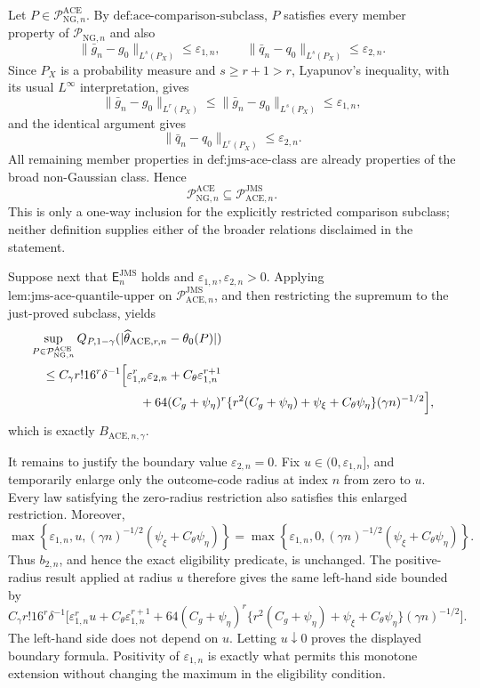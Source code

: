 Let \(P\in\mathcal P_{\mathrm{NG},n}^{\mathrm{ACE}}\).  By
\(\text{def:ace-comparison-subclass}\), \(P\) satisfies every member property of
\(\mathcal P_{\mathrm{NG},n}\) and also
\[
 \|\bar g_n-g_0\|_{L^s(P_X)}\le\varepsilon_{1,n},
 \qquad
 \|\bar q_n-q_0\|_{L^s(P_X)}\le\varepsilon_{2,n}.
\]
Since \(P_X\) is a probability measure and \(s\ge r+1>r\), Lyapunov's inequality, with its usual \(L^{\infty}\) interpretation, gives
\[
 \|\bar g_n-g_0\|_{L^r(P_X)}
 \le\|\bar g_n-g_0\|_{L^s(P_X)}
 \le\varepsilon_{1,n},
\]
and the identical argument gives
\[
 \|\bar q_n-q_0\|_{L^r(P_X)}
 \le\varepsilon_{2,n}.
\]
All remaining member properties in \(\text{def:jms-ace-class}\) are already properties of the broad non-Gaussian class.  Hence
\[
 \mathcal P_{\mathrm{NG},n}^{\mathrm{ACE}}
 \subseteq\mathcal P_{\mathrm{ACE},n}^{\mathrm{JMS}}.
\]
This is only a one-way inclusion for the explicitly restricted comparison subclass; neither definition supplies either of the broader relations disclaimed in the statement.

Suppose next that \(\mathsf E_n^{\mathrm{JMS}}\) holds and
\(\varepsilon_{1,n},\varepsilon_{2,n}>0\).  Applying
\(\text{lem:jms-ace-quantile-upper}\) on
\(\mathcal P_{\mathrm{ACE},n}^{\mathrm{JMS}}\), and then restricting the supremum to the just-proved subclass, yields
\[
\begin{aligned}
 &\sup_{P\in\mathcal P_{\mathrm{NG},n}^{\mathrm{ACE}}}
 Q_{P,1-\gamma}(|\widehat\theta_{\mathrm{ACE},r,n}-\theta_0(P)|)\\
 &\quad\le C_{\gamma}r!16^r\delta^{-1}
 \Big[\varepsilon_{1,n}^r\varepsilon_{2,n}
 +C_{\theta}\varepsilon_{1,n}^{r+1}\\
 &\hspace{31mm}
 +64(C_g+\psi_{\eta})^r
 \{r^2(C_g+\psi_{\eta})+\psi_{\xi}+C_{\theta}\psi_{\eta}\}
 (\gamma n)^{-1/2}\Big],
\end{aligned}
\]
which is exactly \(B_{\mathrm{ACE},n,\gamma}\).

It remains to justify the boundary value \(\varepsilon_{2,n}=0\).  Fix
\(u\in(0,\varepsilon_{1,n}]\), and temporarily enlarge only the outcome-code radius at index \(n\) from zero to \(u\).  Every law satisfying the zero-radius restriction also satisfies this enlarged restriction.  Moreover,
\[
 \max\!\left\{\varepsilon_{1,n},u,
   (\gamma n)^{-1/2}(\psi_{\xi}+C_{\theta}\psi_{\eta})\right\}
 =
 \max\!\left\{\varepsilon_{1,n},0,
   (\gamma n)^{-1/2}(\psi_{\xi}+C_{\theta}\psi_{\eta})\right\}.
\]
Thus \(b_{2,n}\), and hence the exact eligibility predicate, is unchanged.  The positive-radius result applied at radius \(u\) therefore gives the same left-hand side bounded by
\[
 C_{\gamma}r!16^r\delta^{-1}
 \Big[\varepsilon_{1,n}^ru+C_{\theta}\varepsilon_{1,n}^{r+1}
 +64(C_g+\psi_{\eta})^r
 \{r^2(C_g+\psi_{\eta})+\psi_{\xi}+C_{\theta}\psi_{\eta}\}
 (\gamma n)^{-1/2}\Big].
\]
The left-hand side does not depend on \(u\).  Letting \(u\downarrow0\) proves the displayed boundary formula.  Positivity of \(\varepsilon_{1,n}\) is exactly what permits this monotone extension without changing the maximum in the eligibility condition.

